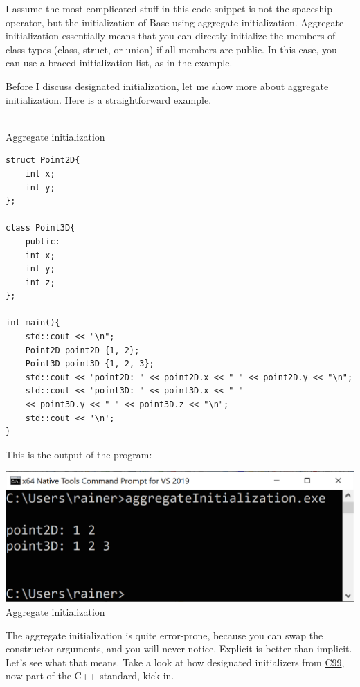 I assume the most complicated stuff in this code snippet is not the spaceship operator, but the initialization of Base using aggregate initialization. Aggregate initialization essentially means that you can directly initialize the members of class types (class, struct, or union) if all members are public. In this case, you can use a braced initialization list, as in the example.

Before I discuss designated initialization, let me show more about aggregate initialization. Here is a straightforward example.

\hspace*{\fill} \\ %
\noindent
Aggregate initialization
\begin{lstlisting}[style=styleCXX]
struct Point2D{
	int x;
	int y;
};

class Point3D{
	public:
	int x;
	int y;
	int z;
};

int main(){
	std::cout << "\n";
	Point2D point2D {1, 2};
	Point3D point3D {1, 2, 3};
	std::cout << "point2D: " << point2D.x << " " << point2D.y << "\n";
	std::cout << "point3D: " << point3D.x << " "
	<< point3D.y << " " << point3D.z << "\n";
	std::cout << '\n';
}
\end{lstlisting}

This is the output of the program:

\begin{center}
\includegraphics[width=1.0\textwidth]{content/2/chapter3/images/5.png}\\
Aggregate initialization
\end{center}

The aggregate initialization is quite error-prone, because you can swap the constructor arguments, and you will never notice. Explicit is better than implicit. Let’s see what that means. Take a look at how designated initializers from \href{https://en.wikipedia.org/wiki/C99}{C99}, now part of the C++ standard, kick in.


